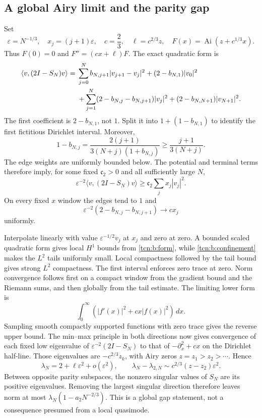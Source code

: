 \documentclass[11pt,letterpaper]{article}
\newcommand{\Ai}{\operatorname{Ai}}
\newcommand{\ip}[2]{\langle#1,#2\rangle}
\newcommand{\eps}{\varepsilon}
\theoremstyle{remark}
\begin{document}
\subsection{A global Airy limit and the parity gap}\label{tcn:b:sec:route2}
Set
\[
 \eps=N^{-1/3},\quad x_j=(j+1)\eps,\quad
 c=\frac23,\quad \ell=c^{2/3}z,\quad
 F(x)=\Ai(z+c^{1/3}x).
\]
Thus $F(0)=0$ and $F''=(cx+\ell)F$. The exact quadratic form is
\begin{align}
 \ip v{(2I-S_N)v}={}&\sum_{j=0}^N b_{N,j+1}|v_{j+1}-v_j|^2
 +(2-b_{N,1})|v_0|^2\notag\\
 &+\sum_{j=1}^N(2-b_{N,j}-b_{N,j+1})|v_j|^2
 +(2-b_{N,N+1})|v_{N+1}|^2.                              \label{tcn:b:form}
\end{align}
The first coefficient is $2-b_{N,1}$, not $1$. Split it into $1+(1-b_{N,1})$ to identify the first fictitious Dirichlet interval. Moreover,
\[
 1-b_{N,j}=\frac{2(j+1)}{3(N+j)(1+b_{N,j})}
             \ge\frac{j+1}{3(N+j)}.
\]
The edge weights are uniformly bounded below. The potential and terminal terms therefore imply, for some fixed $\mathfrak c_2>0$ and all sufficiently large $N$,
\begin{equation}
 \eps^{-2}\ip v{(2I-S_N)v}\ge \mathfrak c_2\sum_jx_j|v_j|^2.          \label{tcn:b:confinement}
\end{equation}
On every fixed $x$ window the edges tend to $1$ and
\[
 \eps^{-2}(2-b_{N,j}-b_{N,j+1})\longrightarrow cx_j
\]
uniformly.

Interpolate linearly with value $\eps^{-1/2}v_j$ at $x_j$ and zero at zero. A bounded scaled quadratic form gives local $H^1$ bounds from \eqref{tcn:b:form}, while \eqref{tcn:b:confinement} makes the $L^2$ tails uniformly small. Local compactness followed by the tail bound gives strong $L^2$ compactness. The first interval enforces zero trace at zero. Norm convergence follows first on a compact window from the gradient bound and the Riemann sums, and then globally from the tail estimate. The limiting lower form is
\[
 \int_0^\infty(|f'(x)|^2+cx|f(x)|^2)\,dx.
\]
Sampling smooth compactly supported functions with zero trace gives the reverse upper bound. The min--max principle in both directions now gives convergence of each fixed low eigenvalue of $\eps^{-2}(2I-S_N)$ to that of $-\partial_x^2+cx$ on the Dirichlet half-line. Those eigenvalues are $-c^{2/3}z_k$, with Airy zeros $z=z_1>z_2>\cdots$. Hence
\begin{equation}
 \lambda_N=2+\ell\eps^2+o(\eps^2),\qquad
 \lambda_N-\lambda_{2,N}\sim c^{2/3}(z-z_2)\eps^2.          \label{tcn:b:gap}
\end{equation}
Between opposite parity subspaces, the nonzero singular values of $S_N$ are its positive eigenvalues. Removing the largest singular direction therefore leaves norm at most $\lambda_N(1-a_2N^{-2/3})$. This is a global gap statement, not a consequence presumed from a local quasimode.
\end{document}
